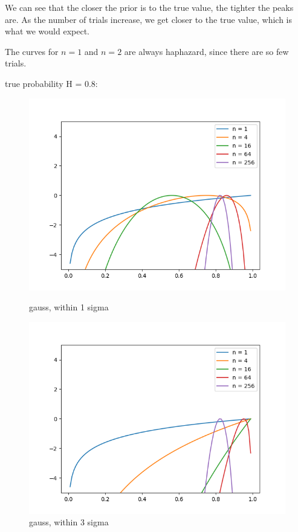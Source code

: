 \documentclass[english]{scrartcl}
\begin{document}
\par We can see that the closer the prior is to the true value, the tighter the peaks are. As the number of trials increase, we get closer to the true value, which is what we would expect.
\par The curves for $n=1$ and $n=2$ are always haphazard, since there are so few trials. 
\newpage
\par true probability H = 0.8:
\begin{figure}[H]
	\includegraphics[width=\linewidth]{coin/h=0.8/gauss_1sigma}
	\caption{gauss, within 1 sigma}  
	\endminipage \hfill
	\includegraphics[width=\linewidth]{coin/h=0.8/gauss_3sigma}
	\caption{gauss, within 3 sigma} 

\end{figure}
\end{document}
